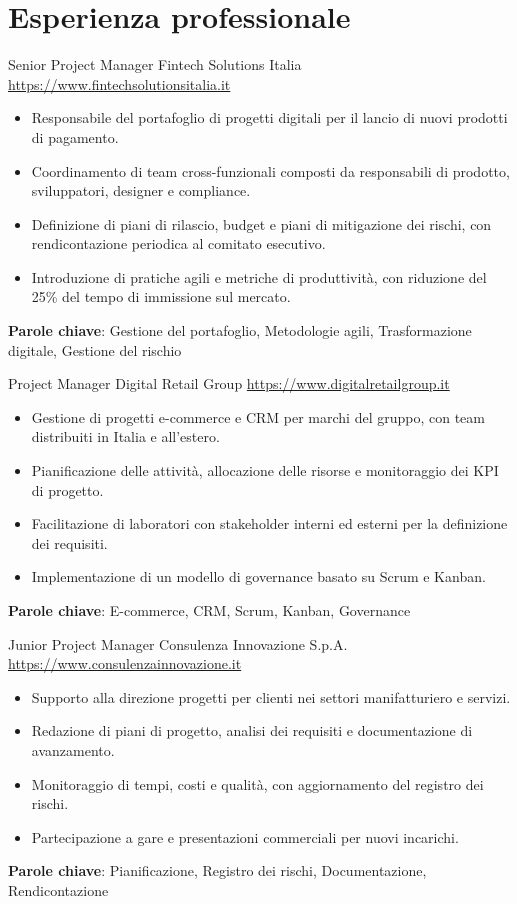 \documentclass[a4paper, serif, 10pt]{moderncv}
\begin{document}
\section{Esperienza professionale}

        {Senior Project Manager}
        {Fintech Solutions Italia}
        {\url{https://www.fintechsolutionsitalia.it}}
        {}
        {\begin{itemize}
\item Responsabile del portafoglio di progetti digitali per il lancio di nuovi prodotti di pagamento.
\item Coordinamento di team cross-funzionali composti da responsabili di prodotto, sviluppatori, designer e compliance.
\item Definizione di piani di rilascio, budget e piani di mitigazione dei rischi, con rendicontazione periodica al comitato esecutivo.
\item Introduzione di pratiche agili e metriche di produttività, con riduzione del 25\% del tempo di immissione sul mercato.
\end{itemize}
\textbf{Parole chiave}: Gestione del portafoglio, Metodologie agili, Trasformazione digitale, Gestione del rischio}

        {Project Manager}
        {Digital Retail Group}
        {\url{https://www.digitalretailgroup.it}}
        {}
        {\begin{itemize}
\item Gestione di progetti e-commerce e CRM per marchi del gruppo, con team distribuiti in Italia e all'estero.
\item Pianificazione delle attività, allocazione delle risorse e monitoraggio dei KPI di progetto.
\item Facilitazione di laboratori con stakeholder interni ed esterni per la definizione dei requisiti.
\item Implementazione di un modello di governance basato su Scrum e Kanban.
\end{itemize}
\textbf{Parole chiave}: E-commerce, CRM, Scrum, Kanban, Governance}

        {Junior Project Manager}
        {Consulenza Innovazione S.p.A.}
        {\url{https://www.consulenzainnovazione.it}}
        {}
        {\begin{itemize}
\item Supporto alla direzione progetti per clienti nei settori manifatturiero e servizi.
\item Redazione di piani di progetto, analisi dei requisiti e documentazione di avanzamento.
\item Monitoraggio di tempi, costi e qualità, con aggiornamento del registro dei rischi.
\item Partecipazione a gare e presentazioni commerciali per nuovi incarichi.
\end{itemize}
\textbf{Parole chiave}: Pianificazione, Registro dei rischi, Documentazione, Rendicontazione}
\end{document}
